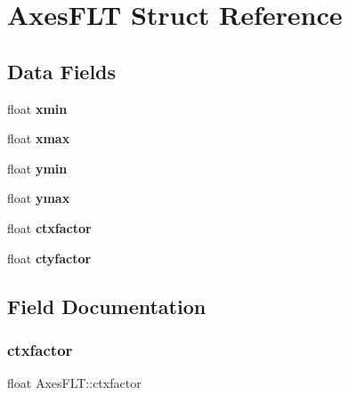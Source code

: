 \hypertarget{struct_axes_f_l_t}{}\section{Axes\+F\+LT Struct Reference}
\label{struct_axes_f_l_t}
\subsection*{Data Fields}
\begin{DoxyCompactItemize}
\item 
\mbox{\label{struct_axes_f_l_t_ade85c4b4a4a8200eb4424c83bd7ace32}} 
float {\bfseries xmin}
\item 
\mbox{\label{struct_axes_f_l_t_a19c4c1aa2322862315f36f5f3a285592}} 
float {\bfseries xmax}
\item 
\mbox{\label{struct_axes_f_l_t_afb3a6ab5a64f5e82f2f04c500c068a9c}} 
float {\bfseries ymin}
\item 
\mbox{\label{struct_axes_f_l_t_a2e8c47bb0be78acec1f281c8dcac097e}} 
float {\bfseries ymax}
\item 
\mbox{\label{struct_axes_f_l_t_a520e859aa39688e2997035ba5f24f515}} 
float {\bfseries ctxfactor}
\item 
\mbox{\label{struct_axes_f_l_t_a8242fd328e74bfe8816229d8a3f596f2}} 
float {\bfseries ctyfactor}
\end{DoxyCompactItemize}


\subsection{Field Documentation}
\mbox{\label{struct_axes_f_l_t_a520e859aa39688e2997035ba5f24f515}} 
\subsubsection{\texorpdfstring{ctxfactor}{ctxfactor}}
{\footnotesize\ttfamily float Axes\+F\+L\+T\+::ctxfactor}

